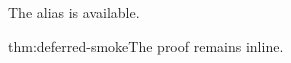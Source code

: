 \documentclass{article}
\begin{document}
\begin{theoremE}\label{thm:deferred-smoke}The alias is available.\end{theoremE}
\begin{deferproof}{thm:deferred-smoke}The proof remains inline.\end{deferproof}
\end{document}
